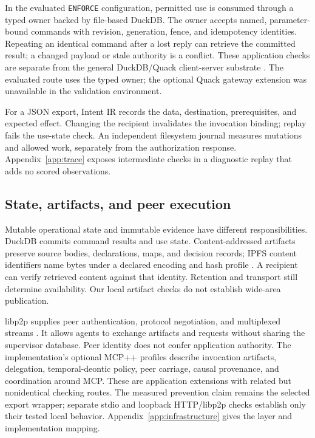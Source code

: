 In the evaluated \texttt{ENFORCE} configuration, permitted use is consumed through a typed owner backed by file-based DuckDB. The owner accepts named, parameter-bound commands with revision, generation, fence, and idempotency identities. Repeating an identical command after a lost reply can retrieve the committed result; a changed payload or stale authority is a conflict. These application checks are separate from the general DuckDB/Quack client-server substrate \citep{quack}. The evaluated route uses the typed owner; the optional Quack gateway extension was unavailable in the validation environment.

For a JSON export, Intent IR records the data, destination, prerequisites, and expected effect. Changing the recipient invalidates the invocation binding; replay fails the use-state check. An independent filesystem journal measures mutations and allowed work, separately from the authorization response. Appendix~\ref{app:trace} exposes intermediate checks in a diagnostic replay that adds no scored observations.

\subsection{State, artifacts, and peer execution}

Mutable operational state and immutable evidence have different responsibilities. DuckDB commits command results and use state. Content-addressed artifacts preserve source bodies, declarations, maps, and decision records; IPFS content identifiers name bytes under a declared encoding and hash profile \citep{ipfs}. A recipient can verify retrieved content against that identity. Retention and transport still determine availability. Our local artifact checks do not establish wide-area publication.

libp2p supplies peer authentication, protocol negotiation, and multiplexed streams \citep{libp2p}. It allows agents to exchange artifacts and requests without sharing the supervisor database. Peer identity does not confer application authority. The implementation's optional MCP++ profiles describe invocation artifacts, delegation, temporal-deontic policy, peer carriage, causal provenance, and coordination around MCP. These are application extensions with related but nonidentical checking routes. The measured prevention claim remains the selected export wrapper; separate stdio and loopback HTTP/libp2p checks establish only their tested local behavior. Appendix~\ref{app:infrastructure} gives the layer and implementation mapping.
